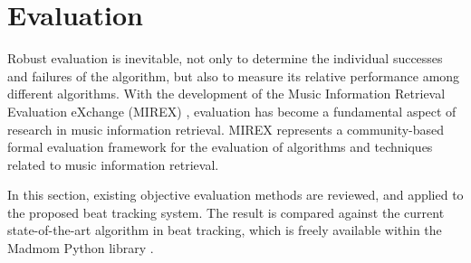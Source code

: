 \documentclass{scrartcl}
\begin{document}



\newpage
\section{Evaluation}

Robust evaluation is inevitable, not only to determine the individual successes and failures of the algorithm, but also to measure its relative performance among different algorithms. With the development of the Music Information Retrieval Evaluation eXchange (MIREX) \cite{Downie2008}, evaluation has become a fundamental aspect of research in music information retrieval. MIREX represents a community-based formal evaluation framework for the evaluation of algorithms and techniques related to music information retrieval.  

In this section, existing objective evaluation methods are reviewed, and applied to the proposed beat tracking system. The result is compared against the current state-of-the-art algorithm in beat tracking, which is freely available within the Madmom Python library \cite{Boeck2016}.




\end{document}
